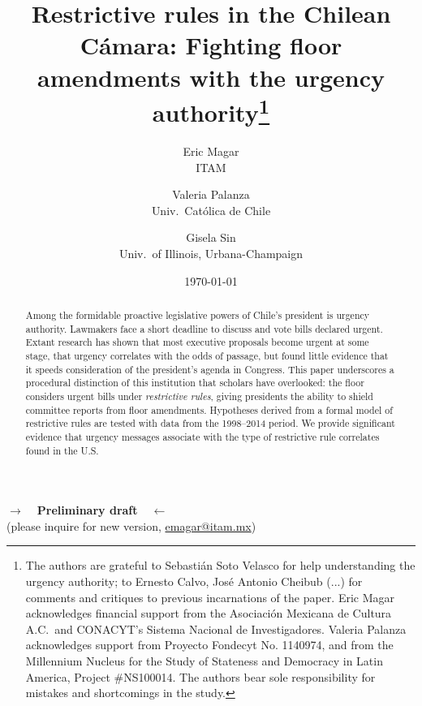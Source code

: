 \documentclass[letter,12pt]{article}
\begin{document}
\title{Restrictive rules in the Chilean Cámara: Fighting floor amendments with the urgency authority\thanks{The authors are grateful to Sebastián Soto Velasco for help understanding the urgency authority; to Ernesto Calvo, José Antonio Cheibub (...)  for comments and critiques to previous incarnations of the paper. Eric Magar acknowledges financial support from the Asociación Mexicana de Cultura A.C.\ and CONACYT's Sistema Nacional de Investigadores. Valeria Palanza acknowledges support from Proyecto Fondecyt No. 1140974, and from the Millennium Nucleus for the Study of Stateness and Democracy in Latin America, Project #NS100014. The authors bear sole responsibility for mistakes and shortcomings in the study.}}
\author{Eric Magar \\ ITAM \and
        Valeria Palanza \\ Univ.\ Católica de Chile \and  
        Gisela Sin \\ Univ.\ of Illinois, Urbana-Champaign 
}
\date{\today}
\maketitle

\begin{center} \textbf{$\rightarrow$~~Preliminary draft~~$\leftarrow$} \\ (please inquire for new version, \small{\url{emagar@itam.mx}})  \end{center}

\begin{abstract}
\noindent Among the formidable proactive legislative powers of Chile's president is urgency authority. Lawmakers face a short deadline to discuss and vote bills declared urgent. Extant research has shown that most executive proposals become urgent at some stage, that urgency correlates with the odds of passage, but found little evidence that it speeds consideration of the president's agenda in Congress. This paper underscores a procedural distinction of this institution that scholars have overlooked: the floor considers urgent bills under \emph{restrictive rules}, giving presidents the ability to shield committee reports from floor amendments. Hypotheses derived from a formal model of restrictive rules are tested with data from the 1998--2014 period. We provide significant evidence that urgency messages associate with the type of restrictive rule correlates found in the U.S.
\end{abstract}

\end{document}
